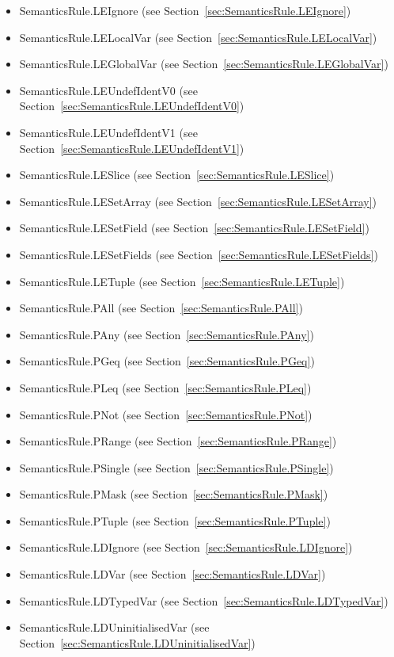 \documentclass{book}
\begin{document}
\begin{itemize}
\item SemanticsRule.LEIgnore (see Section~\ref{sec:SemanticsRule.LEIgnore})
\item SemanticsRule.LELocalVar (see Section~\ref{sec:SemanticsRule.LELocalVar})
\item SemanticsRule.LEGlobalVar (see Section~\ref{sec:SemanticsRule.LEGlobalVar})
\item SemanticsRule.LEUndefIdentV0 (see Section~\ref{sec:SemanticsRule.LEUndefIdentV0})
\item SemanticsRule.LEUndefIdentV1 (see Section~\ref{sec:SemanticsRule.LEUndefIdentV1})
\item SemanticsRule.LESlice (see Section~\ref{sec:SemanticsRule.LESlice})
\item SemanticsRule.LESetArray (see Section~\ref{sec:SemanticsRule.LESetArray})
\item SemanticsRule.LESetField (see Section~\ref{sec:SemanticsRule.LESetField})
\item SemanticsRule.LESetFields (see Section~\ref{sec:SemanticsRule.LESetFields})
\item SemanticsRule.LETuple (see Section~\ref{sec:SemanticsRule.LETuple})
\item SemanticsRule.PAll (see Section~\ref{sec:SemanticsRule.PAll})
\item SemanticsRule.PAny (see Section~\ref{sec:SemanticsRule.PAny})
\item SemanticsRule.PGeq (see Section~\ref{sec:SemanticsRule.PGeq})
\item SemanticsRule.PLeq (see Section~\ref{sec:SemanticsRule.PLeq})
\item SemanticsRule.PNot (see Section~\ref{sec:SemanticsRule.PNot})
\item SemanticsRule.PRange (see Section~\ref{sec:SemanticsRule.PRange})
\item SemanticsRule.PSingle (see Section~\ref{sec:SemanticsRule.PSingle})
\item SemanticsRule.PMask (see Section~\ref{sec:SemanticsRule.PMask})
\item SemanticsRule.PTuple (see Section~\ref{sec:SemanticsRule.PTuple})
\item SemanticsRule.LDIgnore (see Section~\ref{sec:SemanticsRule.LDIgnore})
\item SemanticsRule.LDVar (see Section~\ref{sec:SemanticsRule.LDVar})
\item SemanticsRule.LDTypedVar (see Section~\ref{sec:SemanticsRule.LDTypedVar})
\item SemanticsRule.LDUninitialisedVar (see Section~\ref{sec:SemanticsRule.LDUninitialisedVar})

\end{itemize}
\end{document}
